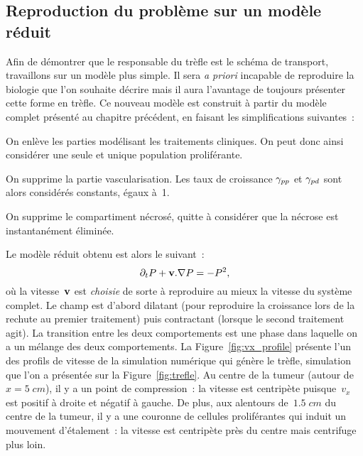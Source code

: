 \documentclass[main.tex]{subfiles}
\begin{document}
\subsection{Reproduction du problème sur un modèle réduit}
Afin de démontrer que le responsable du trèfle est le schéma de transport, travaillons sur un modèle plus simple.%
Il sera \textit{a priori} incapable de reproduire la biologie que l'on souhaite décrire mais il aura l'avantage de toujours présenter cette forme en trèfle. 
Ce nouveau modèle est construit à partir du modèle complet présenté au chapitre précédent, en faisant les simplifications suivantes~:
\begin{myitemize}
\item On enlève les parties modélisant les traitements cliniques. On peut donc ainsi considérer une seule et unique population proliférante.
\item On supprime la partie vascularisation. Les taux de croissance $\gamma_{pp}$ et $\gamma_{pd}$ sont alors considérés constants, égaux à~1.
\item On supprime le compartiment nécrosé, quitte à considérer que la nécrose  est instantanément éliminée.
\end{myitemize}
Le modèle réduit obtenu est alors le suivant~:
\begin{equation}\label{eq:mod_reduit_test_transp}
\partial_t P + \mathbf{v}.\nabla P = -P^2,
\end{equation}
où la vitesse~$\mathbf{v}$ est \emph{choisie} de sorte à reproduire au mieux la vitesse du système complet. Le champ est d'abord dilatant (pour reproduire la croissance lors de la rechute au premier traitement) puis contractant (lorsque le second traitement agit). La transition entre les deux comportements est une phase dans laquelle on a un mélange des deux comportements. 
La Figure~\ref{fig:vx_profile} présente l'un des profils de vitesse de la simulation numérique qui génère le trèfle, simulation que l'on a présentée sur la Figure~\ref{fig:trefle}. 
Au centre de la tumeur (autour de~$x=5\;cm$), il y a un point de compression~: 
la vitesse est centripète puisque~$v_x$ est positif à droite et négatif à gauche. 
De plus, aux alentours de~$1.5\;cm$ du centre de la tumeur, il y a une couronne de cellules proliférantes qui induit un mouvement d'étalement~: la vitesse est centripète près du centre mais centrifuge plus loin. 
\end{document}
